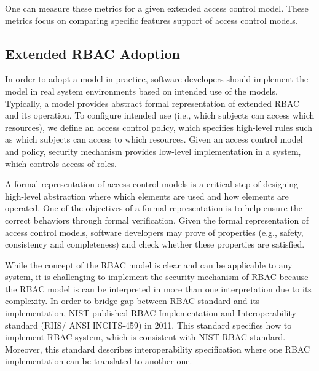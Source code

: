 One can measure these metrics for a given extended access control model. These metrics focus on comparing specific features support of access control models.


\subsection{Extended RBAC Adoption}

In order to adopt a model in practice, software developers should implement the model in real system environments based on intended use of the models. Typically, a model provides abstract formal representation of extended RBAC and its operation. To configure intended use (i.e., which subjects can access which resources), we define an access control policy, which specifies high-level rules such as which subjects can access to which resources. Given an access control model and policy, security mechanism provides low-level implementation in a system, which controls access of roles.

A formal representation of access control models is a critical step of designing high-level abstraction where which elements are used and how elements are operated.
One of the objectives of a formal representation is to help ensure the correct behaviors through formal verification. Given the formal representation of access control models, software developers may prove of properties (e.g., safety, consistency and completeness) and check whether these properties are satisfied. 

While the concept of the RBAC model is clear and can be applicable to any system, it is challenging to implement the security mechanism of RBAC because the RBAC model is can be interpreted in more than one interpretation due to its complexity. In order to bridge gap between RBAC standard and its implementation, NIST published RBAC Implementation and Interoperability standard (RIIS/ ANSI INCITS-459) in 2011. This standard specifies how to implement RBAC system, which is consistent with NIST RBAC standard. Moreover, this standard describes interoperability specification where one RBAC implementation can be translated to another one.

